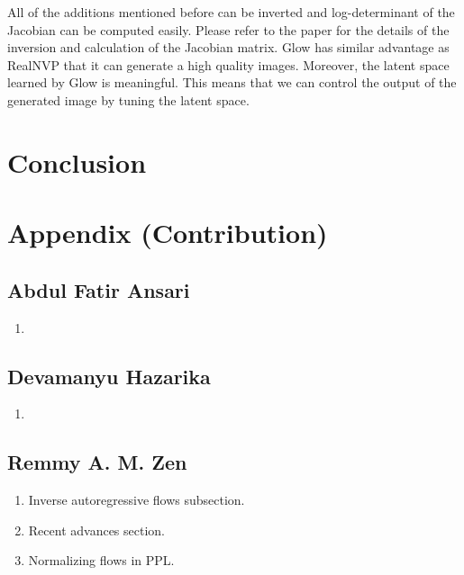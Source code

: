 \documentclass[runningheads]{llncs}
\begin{document}
All of the additions mentioned before can be inverted and log-determinant of the Jacobian can be computed easily. Please refer to the paper for the details of the inversion and calculation of the Jacobian matrix. Glow has similar advantage as RealNVP that it can generate a high quality images. Moreover, the latent space learned by Glow is meaningful. This means that we can control the output of the generated image by tuning the latent space.


\section{Conclusion}
%
%
%
% 
% 
%

 




\appendix


\section{Appendix (Contribution)}
\subsection*{Abdul Fatir Ansari}
\begin{enumerate}
	\item 
\end{enumerate}

\subsection*{Devamanyu Hazarika}
\begin{enumerate}
	\item 
\end{enumerate}


\subsection*{Remmy A. M. Zen}
\begin{enumerate}
	\item Inverse autoregressive flows subsection.
	\item Recent advances section.
	\item Normalizing flows in PPL.
\end{enumerate}
\end{document}
